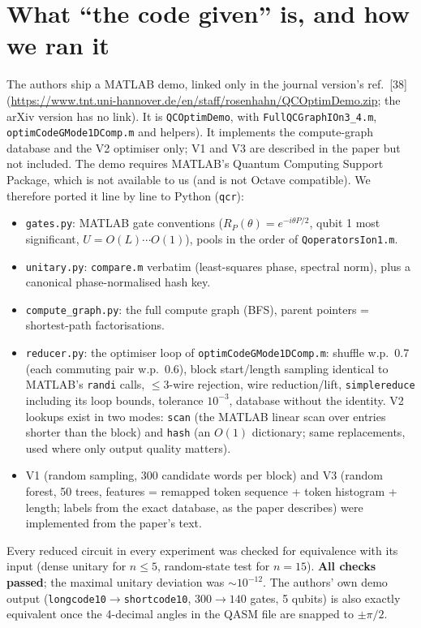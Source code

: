 \documentclass[11pt,a4paper]{article}
\begin{document}
\section{What ``the code given'' is, and how we ran it}
The authors ship a MATLAB demo, linked only in the journal version's ref.~[38]
(\url{https://www.tnt.uni-hannover.de/en/staff/rosenhahn/QCOptimDemo.zip}; the arXiv version has no link). It is \texttt{QCOptimDemo}, with \texttt{FullQCGraphIOn3\_4.m},
\texttt{optimCodeGMode1DComp.m} and helpers). It implements the compute-graph database and the V2 optimiser only;
V1 and V3 are described in the paper but not included. The demo requires MATLAB's Quantum Computing Support Package,
which is not available to us (and is not Octave compatible). We therefore ported it line by line to Python
(\texttt{qcr}):
\begin{itemize}[nosep]
\item \texttt{gates.py}: MATLAB gate conventions ($R_P(\theta)=e^{-i\theta P/2}$, qubit 1 most significant, $U=O(L)\cdots O(1)$), pools
  in the order of \texttt{QoperatorsIon1.m}.
\item \texttt{unitary.py}: \texttt{compare.m} verbatim (least-squares phase, spectral norm), plus a canonical
  phase-normalised hash key.
\item \texttt{compute\_graph.py}: the full compute graph (BFS), parent pointers = shortest-path factorisations.
\item \texttt{reducer.py}: the optimiser loop of \texttt{optimCodeGMode1DComp.m}: shuffle w.p.\ 0.7 (each commuting pair
  w.p.\ 0.6), block start/length sampling identical to MATLAB's \texttt{randi} calls, $\le3$-wire rejection, wire
  reduction/lift, \texttt{simplereduce} including its loop bounds, tolerance $10^{-3}$, database without the identity.
  V2 lookups exist in two modes: \texttt{scan} (the MATLAB linear scan over entries shorter than the block) and \texttt{hash}
  (an $O(1)$ dictionary; same replacements, used where only output quality matters).
\item V1 (random sampling, 300 candidate words per block) and V3 (random forest, 50 trees, features = remapped token
  sequence + token histogram + length; labels from the exact database, as the paper describes) were implemented from the paper's text.
\end{itemize}
Every reduced circuit in every experiment was checked for equivalence with its input (dense unitary for $n\le5$,
random-state test for $n=15$). \textbf{All checks passed}; the maximal unitary deviation was $\sim10^{-12}$.
The authors' own demo output (\texttt{longcode10}$\to$\texttt{shortcode10}, $300\to140$ gates, 5 qubits) is also exactly
equivalent once the 4-decimal angles in the QASM file are snapped to $\pm\pi/2$.
\end{document}
